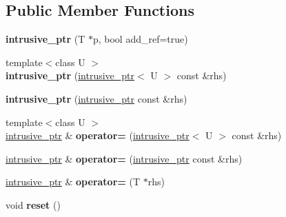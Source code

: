 \subsection*{Public Member Functions}
\begin{DoxyCompactItemize}
\item 
\hypertarget{classintrusive__ptr_a1a462a7c6f3247828d8360ca04511237}{{\bfseries intrusive\+\_\+ptr} (T $\ast$p, bool add\+\_\+ref=true)}\label{classintrusive__ptr_a1a462a7c6f3247828d8360ca04511237}

\item 
\hypertarget{classintrusive__ptr_a60d33e3607b90c2d7f315d2d0be19735}{{\footnotesize template$<$class U $>$ }\\{\bfseries intrusive\+\_\+ptr} (\hyperlink{classintrusive__ptr}{intrusive\+\_\+ptr}$<$ U $>$ const \&rhs)}\label{classintrusive__ptr_a60d33e3607b90c2d7f315d2d0be19735}

\item 
\hypertarget{classintrusive__ptr_a1a05008b03d6cfb92dfa60515cd848d8}{{\bfseries intrusive\+\_\+ptr} (\hyperlink{classintrusive__ptr}{intrusive\+\_\+ptr} const \&rhs)}\label{classintrusive__ptr_a1a05008b03d6cfb92dfa60515cd848d8}

\item 
\hypertarget{classintrusive__ptr_a3f784a56085dd6e9f711e57a803dd1dc}{{\footnotesize template$<$class U $>$ }\\\hyperlink{classintrusive__ptr}{intrusive\+\_\+ptr} \& {\bfseries operator=} (\hyperlink{classintrusive__ptr}{intrusive\+\_\+ptr}$<$ U $>$ const \&rhs)}\label{classintrusive__ptr_a3f784a56085dd6e9f711e57a803dd1dc}

\item 
\hypertarget{classintrusive__ptr_ae1f058e2b20ea4ef7c3c4c30c8c37694}{\hyperlink{classintrusive__ptr}{intrusive\+\_\+ptr} \& {\bfseries operator=} (\hyperlink{classintrusive__ptr}{intrusive\+\_\+ptr} const \&rhs)}\label{classintrusive__ptr_ae1f058e2b20ea4ef7c3c4c30c8c37694}

\item 
\hypertarget{classintrusive__ptr_acbf9dbecf8e789db853832d84e2c7e19}{\hyperlink{classintrusive__ptr}{intrusive\+\_\+ptr} \& {\bfseries operator=} (T $\ast$rhs)}\label{classintrusive__ptr_acbf9dbecf8e789db853832d84e2c7e19}

\item 
\hypertarget{classintrusive__ptr_ae360b0fffd335b683b350c154922c6db}{void {\bfseries reset} ()}\label{classintrusive__ptr_ae360b0fffd335b683b350c154922c6db}


\end{DoxyCompactItemize}
